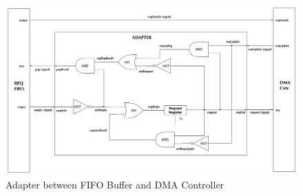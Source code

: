 \begin{appendix}
\begin{figure}[h!]
    \centering
    \includegraphics[width=1.0\textwidth]{Figures/DMA/Adapter}
    \caption{Adapter between FIFO Buffer and DMA Controller}
    \label{fig:adapter}
\end{figure}


\end{appendix}
